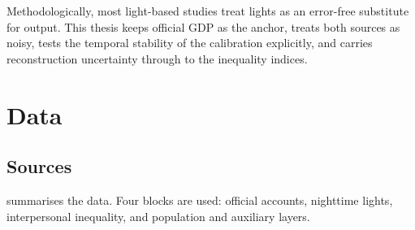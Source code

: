 \documentclass[11pt,a4paper]{article}
\begin{document}
Methodologically, most light-based studies treat lights as an error-free substitute for output. This thesis keeps official GDP as the anchor, treats both sources as noisy, tests the temporal stability of the calibration explicitly, and carries reconstruction uncertainty through to the inequality indices.

\section{Data}\label{sec:data}

\subsection{Sources}

 summarises the data. Four blocks are used: official accounts, nighttime lights, interpersonal inequality, and population and auxiliary layers.
\end{document}
